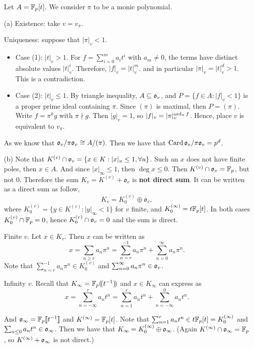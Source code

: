 \begin{solution}
  Let $A = \mathbb{F}_p[t]$. We consider $\pi$ to be a monic polynomial.

  (a) Existence: take $v = v_\pi$.

  Uniqueness: suppose that $|\pi|_v < 1$.
  \begin{itemize}
    \item Case (1): $|t|_v > 1$. For $f = \sum_{i= 0}^m a_i t^i$ with $a_m \neq 0$,
    the terms have distinct absolute values $|t|_v^i$. Therefore, $|f|_v = |t|_v^m$.
    and in particular $|\pi|_v = |t|_v^d > 1$. This is a contradiction.
    \item Case (2): $|t|_v \le 1$. By triangle inequality, $A \subseteq \mathfrak{o}_v$,
    and $P = \{f \in A : |f|_v < 1\}$ is a proper prime ideal containing $\pi$.
    Since $(\pi)$ is maximal, then $P = (\pi)$. Write $f = \pi ^ k g$ with
    $\pi \nmid g$. Then $|g|_v = 1$, so $|f|_v = |\pi|_v ^ {\operatorname{ord}_\pi f}$.
    Hence, place $v$ is equivalent to $v_\pi$.
  \end{itemize}

  As we know that $\mathfrak{o}_v/ \pi \mathfrak{o}_v \cong A / (\pi)$. Then we have
  that $\operatorname{Card}{\mathfrak{o}_v / \pi \mathfrak{o}_v} = p ^ d$.

  (b) Note that $K ^ {(v)} \cap \mathfrak{o}_v = \{x \in K : |x|_u \le 1,  \forall u\}$.
  Such an $x$ does not have finite poles, then $x \in A$. And since $|x|_\infty \le 1$,
  then $\deg x \le 0$. Then $K^{(v)} \cap \mathfrak{o}_v = \mathbb{F}_p$, but not $0$.
  Therefore the sum $K_v=K^{(v)}+\mathfrak o_v$ is \textbf{not direct sum}.
  It can be written as a direct sum as follow,
  \[K_v=K^{(v)}_0\oplus\mathfrak o_v, \]
  where $K^{(v)}_0 = \{y \in K^{(v)}: |y|_\infty < 1 \}$ for $v$ finite, and
  $K^{(\infty)}_0 = t\mathbb{F}_p[t]$. In both cases $K^{(v)}_0 \cap \mathbb{F}_p = 0$, hence
  $K^{(v)}_0 \cap \mathfrak{o}_v = 0$ and the sum is direct.

  Finite $v$. Let $x \in K_v$. Then $x$ can be written as
  \[x = \sum_{n \ge r} a_n \pi ^ n = \sum_{n = r}^{-1} a_n \pi^n
    + \sum_{n=0}^\infty a_n \pi^n. \]
  Note that $\sum_{n = r}^{-1} a_n \pi^n \in K ^{(v)}_0$ and
  $\sum_{n=0}^{\infty} a_n \pi ^n \in \mathfrak{o}_v$.

  Infinity $v$. Recall that $K_\infty = \mathbb{F}_p (\!(t^{-1})\!)$ and
  $x \in K_\infty$ can express as
  \[x = \sum_{n = -\infty}^{r} a_n t ^ n = \sum_{n = 1}^{r} a_n t^n
    + \sum_{n = -\infty}^{0} a_n t^n. \]

  And $\mathfrak{o}_\infty = \mathbb{F}_p \llbracket t^{-1} \rrbracket$ and $K^{(\infty)} = \mathbb{F}_p[t]$. Note that
  $\sum_{n = 1}^{r} a_n t^n \in t\mathbb{F}_p[t] = K^{(\infty)}_0$ and
  $\sum_{n \le 0} a_n t^n \in \mathfrak{o}_\infty$. Then we have that
  $K_\infty = K^{(\infty)}_0 \oplus \mathfrak{o}_\infty$. (Again
  $K^{(\infty)} \cap \mathfrak{o}_\infty = \mathbb{F}_p$, so $K^{(\infty)} + \mathfrak{o}_\infty$ is not direct.)


\end{solution}
